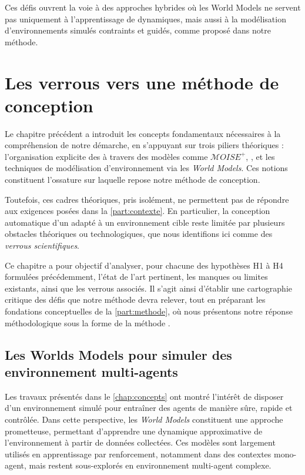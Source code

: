 Ces défis ouvrent la voie à des approches hybrides où les World Models ne servent pas uniquement à l'apprentissage de dynamiques, mais aussi à la modélisation d'environnements simulés contraints et guidés, comme proposé dans notre méthode.

\chapter{Les verrous vers une méthode de conception}
\label{chap:verrous}

\noindent
Le chapitre précédent a introduit les concepts fondamentaux nécessaires à la compréhension de notre démarche, en s'appuyant sur trois piliers théoriques : l'organisation explicite des  à travers des modèles comme \textit{$\mathcal{M}OISE^+$}, , et les techniques de modélisation d'environnement via les \textit{World Models}. Ces notions constituent l'ossature sur laquelle repose notre méthode de conception.

Toutefois, ces cadres théoriques, pris isolément, ne permettent pas de répondre aux exigences posées dans la \autoref{part:contexte}. En particulier, la conception automatique d'un  adapté à un environnement cible reste limitée par plusieurs obstacles théoriques ou technologiques, que nous identifions ici comme des \textit{verrous scientifiques}.

Ce chapitre a pour objectif d'analyser, pour chacune des hypothèses H1 à H4 formulées précédemment, l'état de l'art pertinent, les manques ou limites existants, ainsi que les verrous associés. Il s'agit ainsi d'établir une cartographie critique des défis que notre méthode devra relever, tout en préparant les fondations conceptuelles de la \autoref{part:methode}, où nous présentons notre réponse méthodologique sous la forme de la méthode .


\section{Les Worlds Models pour simuler des environnement multi-agents}

\noindent
Les travaux présentés dans le \autoref{chap:concepts} ont montré l'intérêt de disposer d'un environnement simulé pour entraîner des agents de manière sûre, rapide et contrôlée. Dans cette perspective, les \textit{World Models} constituent une approche prometteuse, permettant d'apprendre une dynamique approximative de l'environnement à partir de données collectées. Ces modèles sont largement utilisés en apprentissage par renforcement, notamment dans des contextes mono-agent, mais restent sous-explorés en environnement multi-agent complexe.


